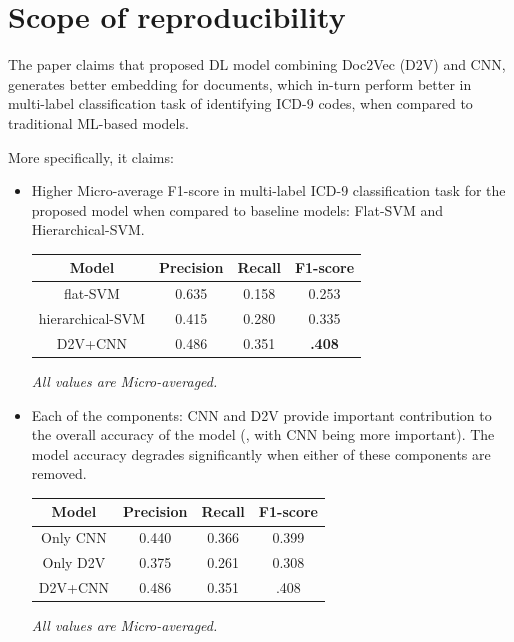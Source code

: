 \documentclass[11pt,a4paper]{article}
\begin{document}
\section{Scope of reproducibility}

The paper claims that proposed DL model combining Doc2Vec (D2V) and CNN, generates better embedding for documents, which in-turn perform better in multi-label classification task of identifying ICD-9 codes, when compared to traditional ML-based models.  

More specifically, it claims:

\begin{itemize}
	\item Higher Micro-average F1-score in multi-label ICD-9 classification task for the proposed model when compared to baseline models: Flat-SVM and Hierarchical-SVM.
\newline

\begin{small}
\begin{tabular}{ cccc }
  \hline
  	Model & Precision & Recall & F1-score \\
  \hline
  	flat-SVM & 0.635 & 0.158 & 0.253 \\ 
  \hline
  	hierarchical-SVM & 0.415 & 0.280 & 0.335 \\ 
  \hline
  	D2V+CNN & 0.486 & 0.351 & \textbf{.408} \\ 
  \hline
\end{tabular}

\textit{All values are Micro-averaged.}
\end{small}

	\item Each of the components: CNN and D2V provide important contribution to the overall accuracy of the model (, with CNN being more important). The model accuracy degrades significantly when either of these components are removed.
\newline

\begin{small}
\begin{tabular}{ cccc }
  \hline
  	Model & Precision & Recall & F1-score \\
  \hline
  	Only CNN & 0.440 & 0.366 & 0.399 \\ 
  \hline
  	Only D2V & 0.375 & 0.261 & 0.308 \\ 
  \hline
  	D2V+CNN & 0.486 & 0.351 & .408 \\ 
  \hline
\end{tabular}

\textit{All values are Micro-averaged.}
\end{small}	
\end{itemize}
 
\end{document}
